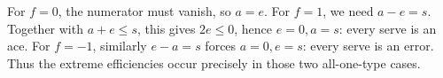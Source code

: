 For $f=0$, the numerator must vanish, so $\boxed{a=e}$. For $f=1$, we need $a-e=s$. Together with $a+e\le s$, this gives $2e\le0$, hence $e=0,a=s$: every serve is an ace. For $f=-1$, similarly $e-a=s$ forces $a=0,e=s$: every serve is an error. Thus the extreme efficiencies occur precisely in those two all-one-type cases.
